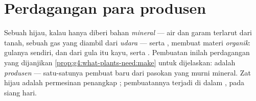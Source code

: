 \section{Perdagangan para produsen}

\begin{proposition}\label{prop:g6:plants-are-producers:produce}
Sebuah  hijau, kalau hanya diberi bahan \emph{mineral} ---
air dan garam terlarut dari tanah, sebuah gas yang diambil dari
\emph{udara} --- serta  \emph{}, membuat materi
\emph{organik}: gulanya sendiri, dan dari gula itu kayu,  serta
. Pembuatan inilah perdagangan yang dijanjikan
\cref{prop:g4:what-plants-need:make} untuk dijelaskan:  adalah
\emph{produsen} --- satu-satunya pembuat  baru dari pasokan yang murni mineral. Zat hijau  adalah
permesinan penangkap ; pembuatannya terjadi di dalam ,
pada siang hari.
\end{proposition}
\admitted

